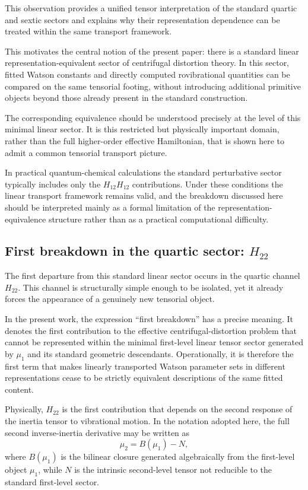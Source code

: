 \documentclass[journal=jacsat,manuscript=article]{achemso}
\begin{document}
This observation provides a unified tensor interpretation of the
standard quartic and sextic sectors and explains why their
representation dependence can be treated within the same transport
framework.

This motivates the central notion of the present paper: there is a
standard linear representation-equivalent sector of centrifugal
distortion theory. In this sector, fitted Watson constants and
directly computed rovibrational quantities can be compared on the same
tensorial footing, without introducing additional primitive objects
beyond those already present in the standard construction.

The corresponding equivalence should be understood precisely at the
level of this minimal linear sector. It is this restricted but
physically important domain, rather than the full higher-order
effective Hamiltonian, that is shown here to admit a common tensorial
transport picture.

In practical quantum-chemical calculations the standard perturbative
sector typically includes only the $H_{12}H_{12}$ contributions. Under
these conditions the linear transport framework remains valid, and the
breakdown discussed here should be interpreted mainly as a formal
limitation of the representation-equivalence structure rather than as a
practical computational difficulty.

\subsection{First breakdown in the quartic sector: \texorpdfstring{$H_{22}$}{H22}}

The first departure from this standard linear sector occurs in the
quartic channel $H_{22}$. This channel is structurally simple enough
to be isolated, yet it already forces the appearance of a genuinely
new tensorial object.

In the present work, the expression ``first breakdown'' has a precise
meaning. It denotes the first contribution to the effective
centrifugal-distortion problem that cannot be represented within the
minimal first-level linear tensor sector generated by $\mu_1$ and its
standard geometric descendants. Operationally, it is therefore the
first term that makes linearly transported Watson parameter sets in
different representations cease to be strictly equivalent descriptions
of the same fitted content.

Physically, $H_{22}$ is the first contribution that depends on the
second response of the inertia tensor to vibrational motion. In the
notation adopted here, the full second inverse-inertia derivative may
be written as
\begin{equation}
\mu_2 = B(\mu_1) - N,
\end{equation}
where $B(\mu_1)$ is the bilinear closure generated algebraically from
the first-level object $\mu_1$, while $N$ is the intrinsic second-level
tensor not reducible to the standard first-level sector.
\end{document}
